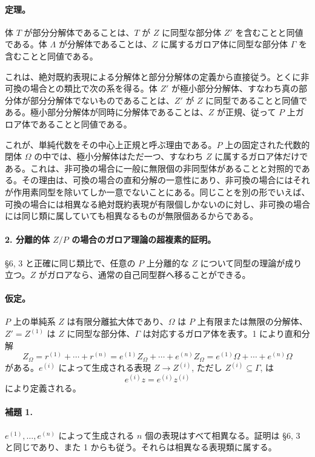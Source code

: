 \paragraph{定理。}
体 \(T\) が部分分解体であることは、\(T\) が \(Z\) に同型な部分体 \(Z'\) を含むことと同値である。体 \(\Lambda\) が分解体であることは、\(Z\) に属するガロア体に同型な部分体 \(\Gamma\) を含むことと同値である。

これは、絶対既約表現による分解体と部分分解体の定義から直接従う。とくに非可換の場合との類比で次の系を得る。体 \(Z'\) が極小部分分解体、すなわち真の部分体が部分分解体でないものであることは、\(Z'\) が \(Z\) に同型であることと同値である。極小部分分解体が同時に分解体であることは、\(Z\) が正規、従って \(P\) 上ガロア体であることと同値である。

これが、単純代数をその中心上正規と呼ぶ理由である。\(P\) 上の固定された代数的閉体 \(\Omega\) の中では、極小分解体はただ一つ、すなわち \(Z\) に属するガロア体だけである。これは、非可換の場合に一般に無限個の非同型体があることと対照的である。その理由は、可換の場合の直和分解の一意性にあり、非可換の場合にはそれが作用素同型を除いてしか一意でないことにある。同じことを別の形でいえば、可換の場合には相異なる絶対既約表現が有限個しかないのに対し、非可換の場合には同じ類に属していても相異なるものが無限個あるからである。

\paragraph{2. 分離的体 \(Z/P\) の場合のガロア理論の超複素的証明。}
§6, 3 と正確に同じ類比で、任意の \(P\) 上分離的な \(Z\) について同型の理論が成り立つ。\(Z\) がガロアなら、通常の自己同型群へ移ることができる。

\paragraph{仮定。}
\(P\) 上の単純系 \(Z\) は有限分離拡大体であり、\(\Omega\) は \(P\) 上有限または無限の分解体、\(Z'=Z^{(1)}\) は \(Z\) に同型な部分体、\(\Gamma\) は対応するガロア体を表す。1 により直和分解
\[
        Z_\Omega=r^{(1)}+\cdots+r^{(n)}
        =e^{(1)}Z_\Omega+\cdots+e^{(n)}Z_\Omega
        =e^{(1)}\Omega+\cdots+e^{(n)}\Omega
\]
がある。\(e^{(i)}\) によって生成される表現 \(Z\to Z^{(i)}\), ただし \(Z^{(i)}\subseteq\Gamma\), は
\[
        e^{(i)}z=e^{(i)}z^{(i)}
\]
により定義される。

\paragraph{補題 1.}
\(e^{(1)},\ldots,e^{(n)}\) によって生成される \(n\) 個の表現はすべて相異なる。証明は §6, 3 と同じであり、また 1 からも従う。それらは相異なる表現類に属する。

